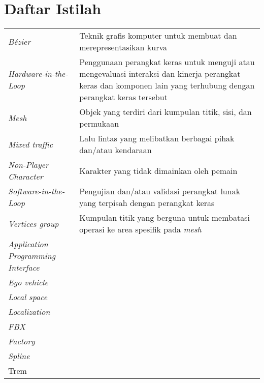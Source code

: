 \chapter*{Daftar Istilah}

\begingroup
\begin{table}[h!]
\begin{onehalfspace}
\begin{tabular}{p{4cm}l}
	\textit{Bézier} & Teknik grafis komputer untuk membuat dan merepresentasikan kurva \\
	\textit{Hardware-in-the-Loop} & Penggunaan perangkat keras untuk menguji atau mengevaluasi interaksi dan kinerja perangkat keras dan komponen lain yang terhubung dengan perangkat keras tersebut \\
	\textit{Mesh} & Objek yang terdiri dari kumpulan titik, sisi, dan permukaan \\
	\textit{Mixed traffic} & Lalu lintas yang melibatkan berbagai pihak dan/atau kendaraan \\
	\textit{Non-Player Character} & Karakter yang tidak dimainkan oleh pemain \\
	\textit{Software-in-the-Loop} & Pengujian dan/atau validasi perangkat lunak yang terpisah dengan perangkat keras \\
	\textit{Vertices group} & Kumpulan titik yang berguna untuk membatasi operasi ke area spesifik pada \textit{mesh} \\

	\textit{Application Programming Interface} & \\
	\textit{Ego vehicle} & \\
	\textit{Local space} & \\
	\textit{Localization} & \\
	\textit{FBX} &  \\
	\textit{Factory} &  \\
	\textit{Spline} &  \\
	Trem & \\



\end{tabular}
\end{onehalfspace}
\end{table}
